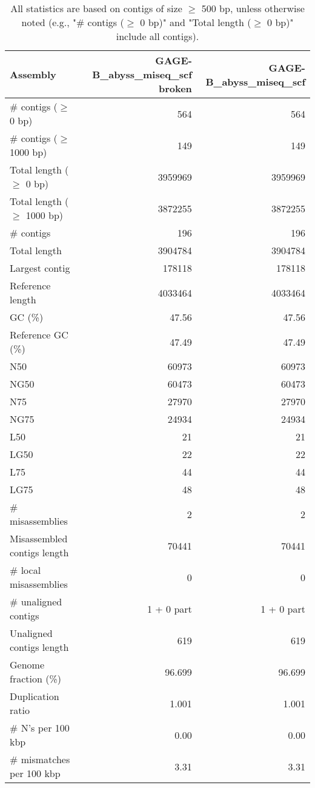\documentclass[12pt,a4paper]{article}
\begin{document}
\begin{table}[ht]
\begin{center}
\caption{All statistics are based on contigs of size $\geq$ 500 bp, unless otherwise noted (e.g., "\# contigs ($\geq$ 0 bp)" and "Total length ($\geq$ 0 bp)" include all contigs).}
\begin{tabular}{|l*{2}{|r}|}
\hline
Assembly & GAGE-B\_abyss\_miseq\_scf broken & GAGE-B\_abyss\_miseq\_scf \\ \hline
\# contigs ($\geq$ 0 bp) & 564 & 564 \\ \hline
\# contigs ($\geq$ 1000 bp) & 149 & 149 \\ \hline
Total length ($\geq$ 0 bp) & 3959969 & 3959969 \\ \hline
Total length ($\geq$ 1000 bp) & 3872255 & 3872255 \\ \hline
\# contigs & 196 & 196 \\ \hline
Total length & 3904784 & 3904784 \\ \hline
Largest contig & 178118 & 178118 \\ \hline
Reference length & 4033464 & 4033464 \\ \hline
GC (\%) & 47.56 & 47.56 \\ \hline
Reference GC (\%) & 47.49 & 47.49 \\ \hline
N50 & 60973 & 60973 \\ \hline
NG50 & 60473 & 60473 \\ \hline
N75 & 27970 & 27970 \\ \hline
NG75 & 24934 & 24934 \\ \hline
L50 & 21 & 21 \\ \hline
LG50 & 22 & 22 \\ \hline
L75 & 44 & 44 \\ \hline
LG75 & 48 & 48 \\ \hline
\# misassemblies & 2 & 2 \\ \hline
Misassembled contigs length & 70441 & 70441 \\ \hline
\# local misassemblies & 0 & 0 \\ \hline
\# unaligned contigs & 1 + 0 part & 1 + 0 part \\ \hline
Unaligned contigs length & 619 & 619 \\ \hline
Genome fraction (\%) & 96.699 & 96.699 \\ \hline
Duplication ratio & 1.001 & 1.001 \\ \hline
\# N's per 100 kbp & 0.00 & 0.00 \\ \hline
\# mismatches per 100 kbp & 3.31 & 3.31 \\ \hline

\end{tabular}
\end{center}
\end{table}
\end{document}
